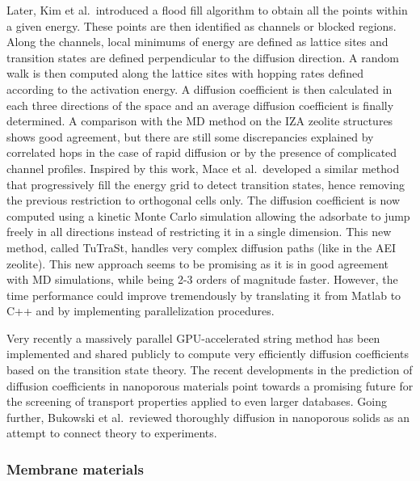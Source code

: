 \documentclass[main.tex]{subfiles}
\begin{document}
Later, Kim et al.\ introduced a flood fill algorithm to obtain all the points within a given energy.\autocite{Kim_2013} These points are then identified as channels or blocked regions. Along the channels, local minimums of energy are defined as lattice sites and transition states are defined perpendicular to the diffusion direction. A random walk is then computed along the lattice sites with hopping rates defined according to the activation energy. A diffusion coefficient is then calculated in each three directions of the space and an average diffusion coefficient is finally determined.
A comparison with the MD method on the IZA zeolite structures shows good agreement, but there are still some discrepancies explained by correlated hops in the case of rapid diffusion or by the presence of complicated channel profiles. Inspired by this work, Mace et al.\ developed a similar method that progressively fill the energy grid to detect transition states, hence removing the previous restriction to orthogonal cells only.\autocite{Mace_2019} The diffusion coefficient is now computed using a kinetic Monte Carlo simulation allowing the adsorbate to jump freely in all directions instead of restricting it in a single dimension. This new method, called TuTraSt, handles very complex diffusion paths (like in the AEI zeolite). This new approach seems to be promising as it is in good agreement with MD simulations, while being 2-3 orders of magnitude faster. However, the time performance could improve tremendously by translating it from Matlab to C++ and by implementing parallelization procedures.

Very recently a massively parallel GPU-accelerated string method has been implemented and shared publicly to compute very efficiently diffusion coefficients {based on the transition state theory}.\autocite{Zhou_2021} The recent developments in the prediction of diffusion coefficients in nanoporous materials point towards a promising future for the screening of transport properties applied to even larger databases. Going further, Bukowski et al.\ reviewed thoroughly diffusion in nanoporous solids as an attempt to connect theory to experiments.\autocite{Bukowski_2021}

\subsubsection{Membrane materials}
\end{document}
